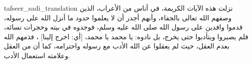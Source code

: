 \begin{taggedblock}{tafseer_sadi_translation}
نزلت هذه الآيات الكريمة، في أناس من الأعراب، الذين وصفهم الله تعالى بالجفاء، وأنهم أجدر أن لا يعلموا حدود ما أنزل الله على رسوله، قدموا وافدين على رسول الله صلى الله عليه وسلم، فوجدوه في بيته وحجرات نسائه، فلم يصبروا ويتأدبوا حتى يخرج، بل نادوه: يا محمد يا محمد،
[أي: اخرج إلينا]
، فذمهم الله بعدم العقل، حيث لم يعقلوا عن الله الأدب مع رسوله واحترامه، كما أن من العقل وعلامته استعمال الأدب.
\end{taggedblock}

\begin{comment}
Please use the following for footnotes:- Sample\footnoteQ{Text of Qur'an footnote goes here.}.
Sample\footnoteT{Text of Tafseer footnote goes here.}.
\end{comment}
